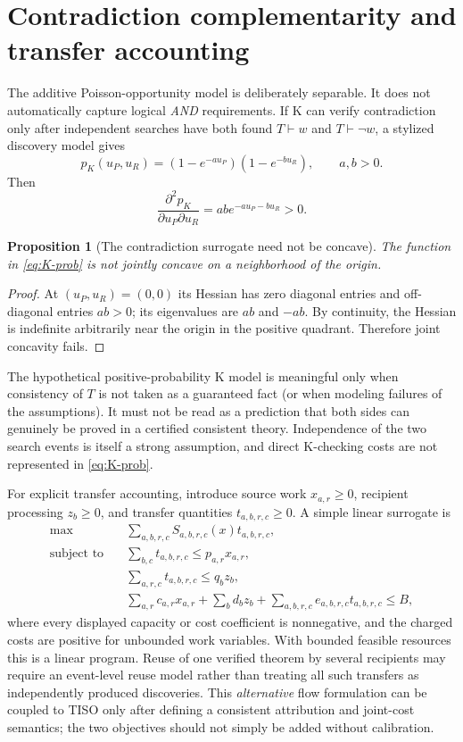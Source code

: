 \documentclass[11pt]{article}
\newtheorem{proposition}[definition]{Proposition}
\begin{document}
\section{Contradiction complementarity and transfer accounting}\label{sec:complement}
The additive Poisson-opportunity model is deliberately separable. It does not automatically capture logical \emph{AND} requirements. If K can verify contradiction only after independent searches have both found $T\vdash w$ and $T\vdash\neg w$, a stylized discovery model gives
\begin{equation}\label{eq:K-prob}
p_K(u_P,u_R)=(1-e^{-a u_P})(1-e^{-b u_R}),\qquad a,b>0.
\end{equation}
Then
\[
\frac{\partial^2p_K}{\partial u_P\partial u_R}=ab e^{-a u_P-b u_R}>0.
\]
\begin{proposition}[The contradiction surrogate need not be concave]
The function in \eqref{eq:K-prob} is not jointly concave on a neighborhood of the origin.
\end{proposition}
\begin{proof}
At $(u_P,u_R)=(0,0)$ its Hessian has zero diagonal entries and off-diagonal entries $ab>0$; its eigenvalues are $ab$ and $-ab$. By continuity, the Hessian is indefinite arbitrarily near the origin in the positive quadrant. Therefore joint concavity fails.
\end{proof}
The hypothetical positive-probability K model is meaningful only when consistency of $T$ is not taken as a guaranteed fact (or when modeling failures of the assumptions). It must not be read as a prediction that both sides can genuinely be proved in a certified consistent theory. Independence of the two search events is itself a strong assumption, and direct K-checking costs are not represented in \eqref{eq:K-prob}.

For explicit transfer accounting, introduce source work $x_{a,r}\ge0$, recipient processing $z_b\ge0$, and transfer quantities $t_{a,b,r,c}\ge0$. A simple linear surrogate is
\begin{align*}
\max\quad &\sum_{a,b,r,c}S_{a,b,r,c}(x)t_{a,b,r,c},\\
\text{subject to}\quad
&\sum_{b,c}t_{a,b,r,c}\le p_{a,r}x_{a,r},\\
&\sum_{a,r,c}t_{a,b,r,c}\le q_bz_b,\\
&\sum_{a,r}c_{a,r}x_{a,r}+\sum_bd_bz_b
 +\sum_{a,b,r,c}e_{a,b,r,c}t_{a,b,r,c}\le B,
\end{align*}
where every displayed capacity or cost coefficient is nonnegative, and the charged costs are positive for unbounded work variables. With bounded feasible resources this is a linear program. Reuse of one verified theorem by several recipients may require an event-level reuse model rather than treating all such transfers as independently produced discoveries. This \emph{alternative} flow formulation can be coupled to TISO only after defining a consistent attribution and joint-cost semantics; the two objectives should not simply be added without calibration.
\end{document}
